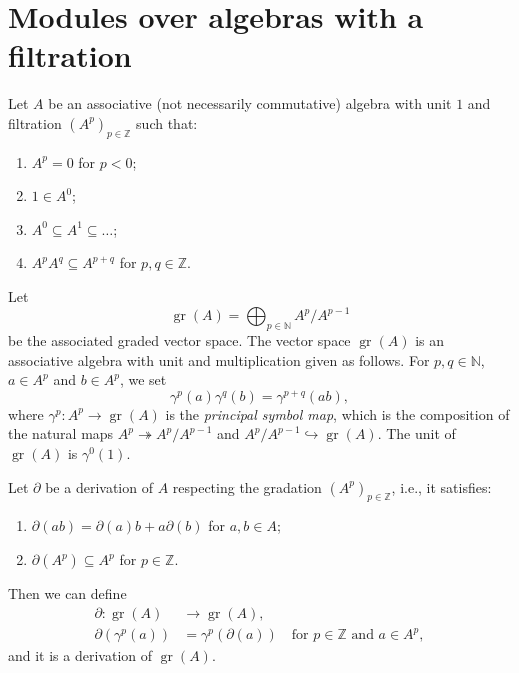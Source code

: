 \documentclass[a4paper, 12pt, reqno]{amsart}
\theoremstyle{remark}
\DeclareMathOperator{\gr}{gr}
\begin{document}
\section{Modules over algebras with a filtration}
\label{sec:modul-over-algebr}

Let $A$ be an associative (not necessarily commutative) algebra with unit $1$ and filtration $(A^p)_{p \in \mathbb{Z}}$ such that:
\begin{enumerate}
\item $A^p = 0$ for $p < 0$;
\item $1 \in A^0$;
\item $A^0 \subseteq A^1 \subseteq \dots$;
\item $A^pA^q \subseteq A^{p + q}$ for $p, q \in \mathbb{Z}$.
\end{enumerate}
Let
\begin{equation*}
  \gr(A) = \bigoplus_{p \in \mathbb{N}}A^p/A^{p - 1}
\end{equation*}
be the associated graded vector space.
The vector space $\gr(A)$ is an associative algebra with unit and multiplication given as follows.
For $p, q \in \mathbb{N}$, $a \in A^p$ and $b \in A^p$, we set
\begin{equation*}
  \gamma^p(a)\gamma^q(b) = \gamma^{p + q}(ab),
\end{equation*}
where $\gamma^p: A^p \to \gr(A)$ is the \emph{principal symbol map}, which is the composition of the natural maps $A^p \twoheadrightarrow A^p/A^{p - 1}$ and $A^p/A^{p - 1} \hookrightarrow \gr(A)$.
The unit of $\gr(A)$ is $\gamma^0(1)$.

Let $\partial$ be a derivation of $A$ respecting the gradation $(A^p)_{p \in \mathbb{Z}}$, i.e., it satisfies:
\begin{enumerate}
\item $\partial(ab) = \partial(a)b + a\partial(b)$ for $a, b \in A$;
\item $\partial(A^p) \subseteq A^p$ for $p \in \mathbb{Z}$.
\end{enumerate}
Then we can define
\begin{align*}
  \partial: \gr(A) &\to \gr(A), \\
  \partial(\gamma^p(a)) &= \gamma^p(\partial(a)) \quad \text{for $p \in \mathbb{Z}$ and $a \in A^p$},
\end{align*}
and it is a derivation of $\gr(A)$.
\end{document}
